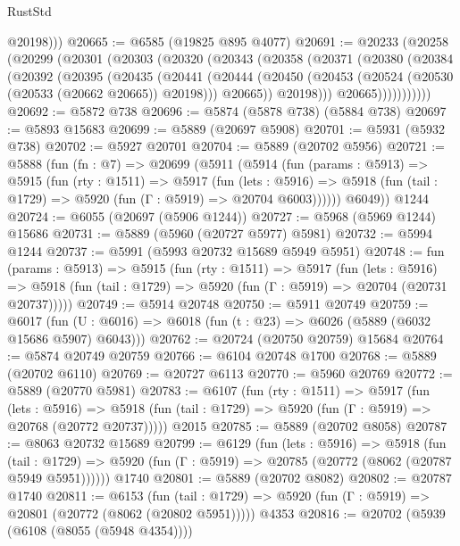 \begin{lexlean}{RustStd}
\begin{coremodule}
          @20198)))
@20665 := @6585 (@19825 @895 @4077)
@20691 := @20233
    (@20258
      (@20299
        (@20301
          (@20303
            (@20320
              (@20343
                (@20358
                  (@20371
                    (@20380
                      (@20384
                        (@20392
                          (@20395
                            (@20435
                              (@20441
                                (@20444
                                  (@20450
                                    (@20453 (@20524 (@20530 (@20533 (@20662 @20665)) @20198)))
                                    @20665))
                                @20198)))
                          @20665)))))))))))
@20692 := @5872 @738
@20696 := @5874 (@5878 @738) (@5884 @738)
@20697 := @5893 @15683
@20699 := @5889 (@20697 @5908)
@20701 := @5931 (@5932 @738)
@20702 := @5927 @20701
@20704 := @5889 (@20702 @5956)
@20721 := @5888
    (fun (fn : @7) =>
    @20699
      (@5911
        (@5914
          (fun (params : @5913) =>
          @5915
            (fun (rty : @1511) =>
            @5917
              (fun (lets : @5916) =>
              @5918 (fun (tail : @1729) => @5920 (fun (Γ : @5919) => @20704 @6003))))))
        @6049))
    @1244
@20724 := @6055 (@20697 (@5906 @1244))
@20727 := @5968 (@5969 @1244) @15686
@20731 := @5889 (@5960 (@20727 @5977) @5981)
@20732 := @5994 @1244
@20737 := @5991 (@5993 @20732 @15689 @5949 @5951)
@20748 := fun (params : @5913) =>
  @5915
    (fun (rty : @1511) =>
    @5917
      (fun (lets : @5916) =>
      @5918 (fun (tail : @1729) => @5920 (fun (Γ : @5919) => @20704 (@20731 @20737)))))
@20749 := @5914 @20748
@20750 := @5911 @20749
@20759 := @6017
    (fun (U : @6016) => @6018 (fun (t : @23) => @6026 (@5889 (@6032 @15686 @5907) @6043)))
@20762 := @20724 (@20750 @20759) @15684
@20764 := @5874 @20749 @20759
@20766 := @6104 @20748 @1700
@20768 := @5889 (@20702 @6110)
@20769 := @20727 @6113
@20770 := @5960 @20769
@20772 := @5889 (@20770 @5981)
@20783 := @6107
    (fun (rty : @1511) =>
    @5917
      (fun (lets : @5916) =>
      @5918 (fun (tail : @1729) => @5920 (fun (Γ : @5919) => @20768 (@20772 @20737)))))
    @2015
@20785 := @5889 (@20702 @8058)
@20787 := @8063 @20732 @15689
@20799 := @6129
    (fun (lets : @5916) =>
    @5918
      (fun (tail : @1729) =>
      @5920 (fun (Γ : @5919) => @20785 (@20772 (@8062 (@20787 @5949 @5951))))))
    @1740
@20801 := @5889 (@20702 @8082)
@20802 := @20787 @1740
@20811 := @6153
    (fun (tail : @1729) => @5920 (fun (Γ : @5919) => @20801 (@20772 (@8062 (@20802 @5951)))))
    @4353
@20816 := @20702 (@5939 (@6108 (@8055 (@5948 @4354))))

\end{coremodule}
\end{lexlean}
